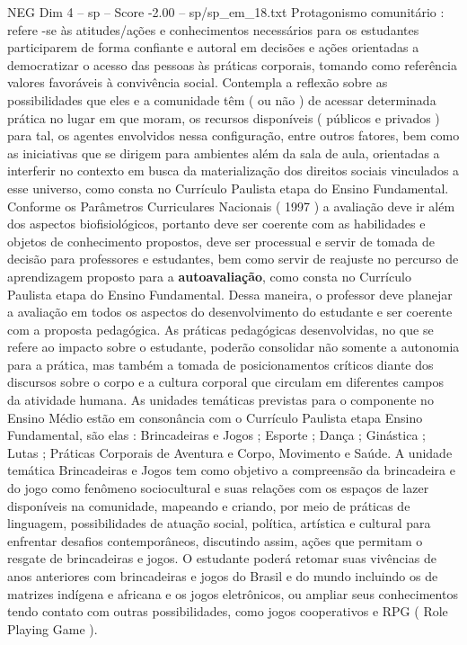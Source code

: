 \begin{textsample}{NEG Dim 4 – sp – Score -2.00 – sp/sp\_em\_18.txt}
Protagonismo comunitário : refere -se às atitudes/ações e conhecimentos necessários para os estudantes participarem de forma confiante e autoral em decisões e ações orientadas a democratizar o acesso das pessoas às práticas corporais, tomando como referência valores favoráveis à convivência social.
Contempla a reflexão sobre as possibilidades que eles e a comunidade têm ( ou não ) de acessar determinada prática no lugar em que moram, os recursos disponíveis ( públicos e privados ) para tal, os agentes envolvidos nessa configuração, entre outros fatores, bem como as iniciativas que se dirigem para ambientes além da sala de aula, orientadas a interferir no contexto em busca da materialização dos direitos sociais vinculados a esse universo, como consta no Currículo Paulista etapa do Ensino Fundamental.
Conforme os Parâmetros Curriculares Nacionais ( 1997 ) a avaliação deve ir além dos aspectos biofisiológicos, portanto deve ser coerente com as habilidades e objetos de conhecimento propostos, deve ser processual e servir de tomada de decisão para professores e estudantes, bem como servir de reajuste no percurso de aprendizagem proposto para a \textbf{autoavaliação}, como consta no Currículo Paulista etapa do Ensino Fundamental.
Dessa maneira, o professor deve planejar a avaliação em todos os aspectos do desenvolvimento do estudante e ser coerente com a proposta pedagógica.
As práticas pedagógicas desenvolvidas, no que se refere ao impacto sobre o estudante, poderão consolidar não somente a autonomia para a prática, mas também a tomada de posicionamentos críticos diante dos discursos sobre o corpo e a cultura corporal que circulam em diferentes campos da atividade humana.
As unidades temáticas previstas para o componente no Ensino Médio estão em consonância com o Currículo Paulista etapa Ensino Fundamental, são elas : Brincadeiras e Jogos ; Esporte ; Dança ; Ginástica ; Lutas ; Práticas Corporais de Aventura e Corpo, Movimento e Saúde.
A unidade temática Brincadeiras e Jogos tem como objetivo a compreensão da brincadeira e do jogo como fenômeno sociocultural e suas relações com os espaços de lazer disponíveis na comunidade, mapeando e criando, por meio de práticas de linguagem, possibilidades de atuação social, política, artística e cultural para enfrentar desafios contemporâneos, discutindo assim, ações que permitam o resgate de brincadeiras e jogos.
O estudante poderá retomar suas vivências de anos anteriores com brincadeiras e jogos do Brasil e do mundo incluindo os de matrizes indígena e africana e os jogos eletrônicos, ou ampliar seus conhecimentos tendo contato com outras possibilidades, como jogos cooperativos e RPG ( Role Playing Game ).

\end{textsample}
